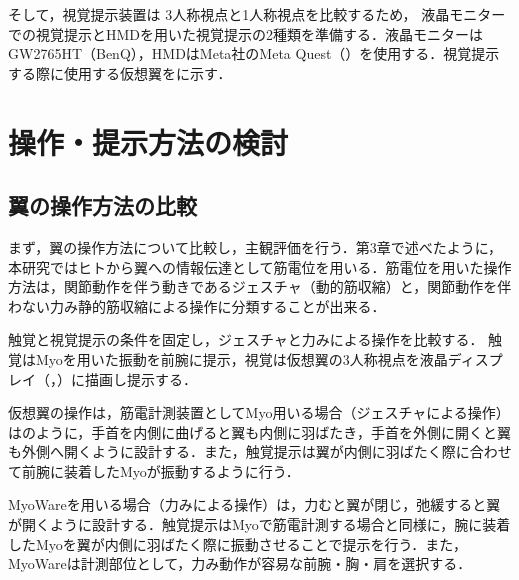     そして，視覚提示装置は
    3人称視点と1人称視点を比較するため，
    液晶モニターでの視覚提示とHMDを用いた視覚提示の2種類を準備する．液晶モニターはGW2765HT（BenQ），HMDはMeta社のMeta Quest（）\cite{OculusQuest}を使用する．視覚提示する際に使用する仮想翼をに示す．

\section{操作・提示方法の検討}

    \subsection{翼の操作方法の比較}
        まず，翼の操作方法について比較し，主観評価を行う．第3章で述べたように，本研究ではヒトから翼への情報伝達として筋電位を用いる．筋電位を用いた操作方法は，関節動作を伴う動きであるジェスチャ（動的筋収縮）と，関節動作を伴わない力み静的筋収縮\cite{thistle1967isokinetic}による操作に分類することが出来る．

        触覚と視覚提示の条件を固定し，ジェスチャと力みによる操作を比較する． 触覚はMyoを用いた振動を前腕に提示，視覚は仮想翼の3人称視点を液晶ディスプレイ（，）に描画し提示する．

        仮想翼の操作は，筋電計測装置としてMyo用いる場合（ジェスチャによる操作）はのように，手首を内側に曲げると翼も内側に羽ばたき，手首を外側に開くと翼も外側へ開くように設計する．また，触覚提示は翼が内側に羽ばたく際に合わせて前腕に装着したMyoが振動するように行う．
        
        MyoWareを用いる場合（力みによる操作）は，力むと翼が閉じ，弛緩すると翼が開くように設計する．触覚提示はMyoで筋電計測する場合と同様に，腕に装着したMyoを翼が内側に羽ばたく際に振動させることで提示を行う．また，MyoWareは計測部位として，力み動作が容易な前腕・胸・肩を選択する．

